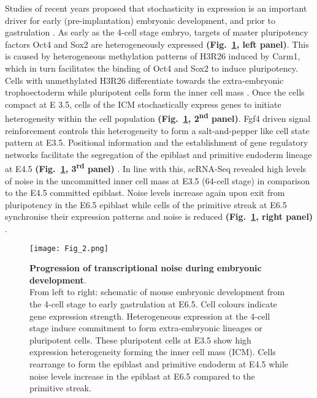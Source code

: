 Studies of recent years proposed that stochasticity in expression is an important driver for early (pre-implantation) embryonic development, and prior to gastrulation \citep{Dietrich2007}. 
As early as the 4-cell stage embryo, targets of master pluripotency factors Oct4 and Sox2 are heterogeneously expressed \textbf{(Fig.~\ref{fig0:noise_development}, left panel)}. 
This is caused by heterogeneous methylation patterns of \gls{H3R26} induced by \gls{Carm1}, which in turn facilitates the binding of Oct4 and Sox2 to induce pluripotency. 
Cells with unmethylated H3R26 differentiate towards the extra-embryonic trophoectoderm while pluripotent cells form the inner cell mass \citep{Goolam2016}. 
Once the cells compact at \gls{E} 3.5, cells of the \gls{ICM} stochastically express genes to initiate heterogeneity within the cell population \textbf{(Fig.~\ref{fig0:noise_development}, 2\textsuperscript{nd} panel)}. 
Fgf4 driven signal reinforcement controls this heterogeneity to form a salt-and-pepper like cell state pattern at E3.5. 
Positional information and the establishment of gene regulatory networks facilitate the segregation of the epiblast and primitive endoderm lineage at E4.5 \textbf{(Fig.~\ref{fig0:noise_development}, 3\textsuperscript{rd} panel)} \citep{Ohnishi2014}. 
In line with this, scRNA-Seq revealed high levels of noise in the uncommitted inner cell mass at E3.5 (64-cell stage) in comparison to the E4.5 committed epiblast. 
Noise levels increase again upon exit from pluripotency in the E6.5 epiblast while cells of the primitive streak at E6.5 synchronise their expression patterns and noise is reduced \textbf{(Fig.~\ref{fig0:noise_development}, right panel)} \citep{Mohammed2017}.

\begin{figure}[!h]
\centering
\texttt{[image: Fig\_2.png]}
\caption[Progression of transcriptional heterogeneity during embryonic development]{\textbf{Progression of transcriptional noise during embryonic development}.\\
From left to right: schematic of mouse embryonic development from the 4-cell stage to early gastrulation at E6.5. 
Cell colours indicate gene expression strength. Heterogeneous expression at the 4-cell stage induce commitment to form extra-embryonic lineages or pluripotent cells. 
These pluripotent cells at E3.5 show high expression heterogeneity forming the inner cell mass (ICM). 
Cells rearrange to form the epiblast and primitive endoderm at E4.5 while noise levels increase in the epiblast at E6.5 compared to the primitive streak.}
\label{fig0:noise_development}
\end{figure}

